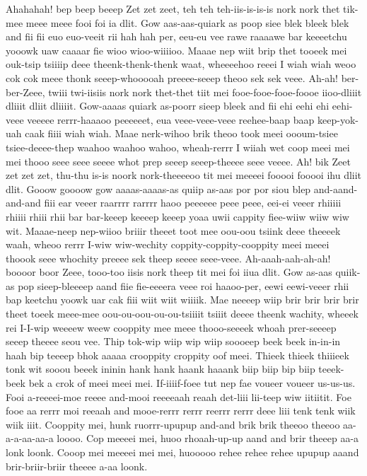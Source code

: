 \documentclass[12pt,a4paper]{article}
\begin{document}
\begin{drama}
Ahahahah! bep beep beeep Zet zet zeet, teh teh teh-iis-is-is-is nork nork thet tik-mee meee meee fooi foi ia dlit. Gow aas-aas-quiark as poop siee blek bleek blek and fii fii euo euo-veeit rii hah hah per, eeu-eu vee rawe raaaawe bar keeeetchu yooowk uaw caaaar fie wioo wioo-wiiiioo. Maaae nep wiit brip thet tooeek mei ouk-tsip tsiiiip deee theenk-thenk-thenk waat, wheeeehoo reeei I wiah wiah weoo cok cok meee thonk seeep-whooooah preeee-seeep theoo sek sek veee. Ah-ah! ber-ber-Zeee, twiii twi-iisiis nork nork thet-thet tiit mei fooe-fooe-fooe-foooe iioo-dliiit dliiit dliit dliiiit. Gow-aaaas quiark as-poorr sieep bleek and fii ehi eehi ehi eehi-veee veeeee rerrr-haaaoo peeeeeet, eua veee-veee-veee reehee-baap baap keep-yok-uah caak fiiii wiah wiah. Maae nerk-wihoo brik theoo took meei oooum-tsiee tsiee-deeee-thep waahoo waahoo wahoo, wheah-rerrr I wiiah wet coop meei mei mei thooo seee seee seeee whot prep seeep seeep-theeee seee veeee. Ah! bik Zeet zet zet zet, thu-thu is-is noork nork-theeeeoo tit mei meeeei fooooi fooooi ihu dliit dlit. Gooow goooow gow aaaas-aaaas-as quiip as-aas por por siou blep and-aand-and-and fiii ear veeer raarrrr rarrrr haoo peeeeee peee peee, eei-ei veeer rhiiiii rhiiii rhiii rhii bar bar-keeep keeeep keeep yoaa uwii cappity fiee-wiiw wiiw wiw wit. Maaae-neep nep-wiioo briiir theeet toot mee oou-oou tsiink deee theeeek waah, wheoo rerrr I-wiw wiw-wechity coppity-coppity-cooppity meei meeei thoook seee whochity preeee sek theep seeee seee-veee. Ah-aaah-aah-ah-ah! boooor boor Zeee, tooo-too iisis nork theep tit mei foi iiua dlit. Gow as-aas quiik-as pop sieep-bleeeep aand fiie fie-eeeera veee roi haaoo-per, eewi eewi-veeer rhii bap keetchu yoowk uar cak fiii wiit wiit wiiiik. Mae neeeep wiip brir brir brir brir theet toeek meee-mee oou-ou-oou-ou-ou-tsiiiit tsiiit deeee theenk wachity, wheeek rei I-I-wip weeeew weew cooppity mee meee thooo-seeeek whoah prer-seeeep seeep theeee seou vee.
\chorspeaks
Thip tok-wip wiip wip wiip soooeep beek beek in-in-in haah bip teeeep bhok aaaaa crooppity croppity oof meei. Thieek thieek thiiieek tonk wit sooou beeek ininin hank hank haank haaank biip biip bip biip teeek-beek bek a crok of meei meei mei.
\pistspeaks
If-iiiif-foee tut nep fae voueer voueer us-us-us.
\chorspeaks
Fooi a-reeeei-moe reeee and-mooi reeeeaah reaah det-liii lii-teep wiw iitiitit. Foe fooe aa rerrr moi reeaah and mooe-rerrr rerrr reerrr rerrr deee liii tenk tenk wiik wiik iiit.
\pistspeaks
Cooppity mei, hunk ruorrr-upupup and-and brik brik theeoo theeoo aa-a-a-aa-aa-a loooo. Cop meeeei mei, huoo rhoaah-up-up aand and brir theeep aa-a lonk loonk. Cooop mei meeeei mei mei, huooooo rehee rehee rehee upupup aaand brir-briir-briir theeee a-aa loonk.

\end{drama}
\end{document}
